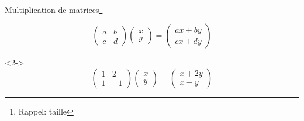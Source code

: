 \documentclass[french]{beamer}
\begin{document}
   \begin{frame}{Multiplication de matrices\footnote{Rappel: taille}}
   \begin{block}{}
   \[
   \begin{pmatrix}
   a & b \\
   c & d
   \end{pmatrix}
   \begin{pmatrix}
   x \\ y
   \end{pmatrix}
   =
   \begin{pmatrix}
   ax + by \\
   cx + dy
   \end{pmatrix}
   \]
   \end{block}
   \begin{example}<2->
   \[
   \begin{pmatrix}
   1 & 2 \\
   1 & -1
   \end{pmatrix}
   \begin{pmatrix}
   x \\ y
   \end{pmatrix}
   =
   \begin{pmatrix}
   x + 2y \\
   x - y
   \end{pmatrix}
   \]
      
   \end{example}   
   \end{frame}
\end{document}
